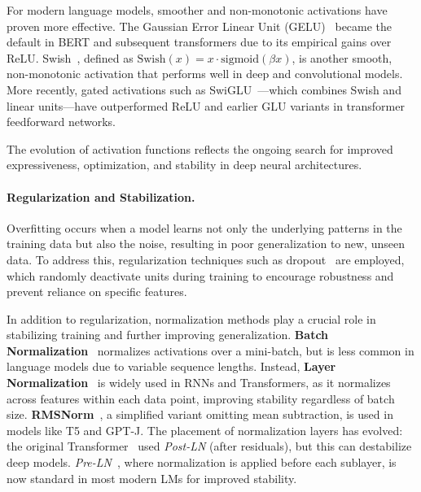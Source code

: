 For modern language models, smoother and non-monotonic activations have proven more effective. The Gaussian Error Linear Unit (GELU)~\citep{hendrycks2016gaussian} became the default in BERT and subsequent transformers due to its empirical gains over ReLU. Swish~\citep{ramachandran2017searching}, defined as $\mathrm{Swish}(x) = x \cdot \mathrm{sigmoid}(\beta x)$, is another smooth, non-monotonic activation that performs well in deep and convolutional models. More recently, gated activations such as SwiGLU~\citep{shazeer2020glu}—which combines Swish and linear units—have outperformed ReLU and earlier GLU variants in transformer feedforward networks.

The evolution of activation functions reflects the ongoing search for improved expressiveness, optimization, and stability in deep neural architectures.

\paragraph{Regularization and Stabilization.} Overfitting occurs when a model learns not only the underlying patterns in the training data but also the noise, resulting in poor generalization to new, unseen data. To address this, regularization techniques such as dropout~\citep{srivastava2014dropout} are employed, which randomly deactivate units during training to encourage robustness and prevent reliance on specific features.

In addition to regularization, normalization methods play a crucial role in stabilizing training and further improving generalization. \textbf{Batch Normalization}~\citep{ioffe2015batchnorm} normalizes activations over a mini-batch, but is less common in language models due to variable sequence lengths. Instead, \textbf{Layer Normalization}~\citep{ba2016layernorm} is widely used in RNNs and Transformers, as it normalizes across features within each data point, improving stability regardless of batch size. \textbf{RMSNorm}~\citep{zhang2019rmsnorm}, a simplified variant omitting mean subtraction, is used in models like T5 and GPT-J. The placement of normalization layers has evolved: the original Transformer~\citep{vaswani2017attention} used \emph{Post-LN} (after residuals), but this can destabilize deep models. \emph{Pre-LN}~\citep{xiong2020layer}, where normalization is applied before each sublayer, is now standard in most modern LMs for improved stability.


